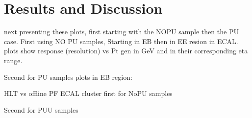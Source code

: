 \section{Results and Discussion}


next presenting these plots, first starting with the NOPU sample then the PU case.
First using NO PU samples, Starting in EB then in EE resion in ECAL. plots show response (resolution) vs Pt gen in GeV and in their corresponding eta range.





Second for PU samples plots in EB region:






HLT vs offline PF ECAL cluster
first for NoPU samples

Second for PUU samples



